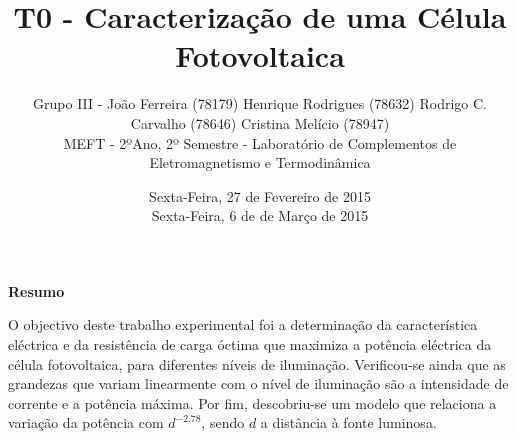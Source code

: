 \documentclass[10pt]{extarticle}
\renewenvironment{abstract}
 {\small
  \begin{center}
  \bfseries \abstractname\vspace{-.5em}\vspace{0pt}
  \end{center}
  \list{}{
    \setlength{\leftmargin}{0cm}%
    \setlength{\rightmargin}{\leftmargin}%
  }%
  \item\relax}
 {\endlist}
\renewcommand{\abstractname}{Resumo}
\begin{document}
\title {\bf \huge T0 - Caracterização de uma Célula Fotovoltaica}
\author
{{\small Grupo III - João Ferreira (78179) Henrique Rodrigues (78632) Rodrigo C. Carvalho (78646) Cristina Melício (78947)} \\
{\small MEFT - 2ºAno, 2º Semestre - Laboratório de Complementos de Eletromagnetismo e Termodinâmica}}
\date{{\small Sexta-Feira, 27 de Fevereiro de 2015 \\ Sexta-Feira, 6 de de Março de 2015}}
\maketitle

\begin{abstract}
\par O objectivo deste trabalho experimental foi a determinação da característica eléctrica e da resistência de carga óctima que maximiza a potência eléctrica da célula fotovoltaica, para diferentes níveis de iluminação.
Verificou-se ainda que as grandezas que variam linearmente com o nível de iluminação são a intensidade de corrente e a potência máxima.
Por fim, descobriu-se um modelo que relaciona a variação da potência com $d^{-2.78}$, sendo $d$ a distância à fonte luminosa.
\end{abstract}
\end{document}

